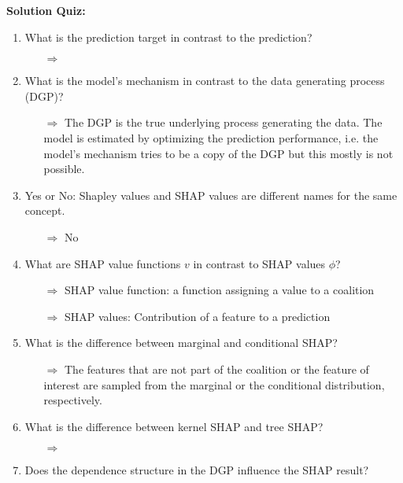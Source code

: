 \textbf{Solution Quiz:}\\\noindent
\medskip

\begin{enumerate}
    \item What is the prediction target in contrast to the prediction?
    \begin{itemize}
    	\item[$\Rightarrow$] 
    \end{itemize}
    \item What is the model's mechanism in contrast to the data generating process (DGP)?
    \begin{itemize}
    	\item[$\Rightarrow$]  The DGP is the true underlying process generating the data. The model is estimated by optimizing the prediction performance, i.e. the model's mechanism tries to be a copy of the DGP but this mostly is not possible.
    \end{itemize}
    \item Yes or No: Shapley values and SHAP values are different names for the same concept.
    \begin{itemize}
    	\item[$\Rightarrow$] No %
    \end{itemize}
    \item What are SHAP value functions $v$ in contrast to SHAP values $\phi$?
    \begin{itemize}
    	\item[$\Rightarrow$] SHAP value function: a function assigning a value to a coalition
    	\item[$\Rightarrow$] SHAP values: Contribution of a feature to a prediction
    \end{itemize}
    \item What is the difference between marginal and conditional SHAP?
    \begin{itemize}
    	\item[$\Rightarrow$] The features that are not part of the coalition or the feature of interest are sampled from the marginal or the conditional distribution, respectively.
    \end{itemize}
    \item What is the difference between kernel SHAP and tree SHAP?
    \begin{itemize}
    	\item[$\Rightarrow$] 
    \end{itemize}
    \item Does the dependence structure in the DGP influence the SHAP result?

\end{enumerate}
